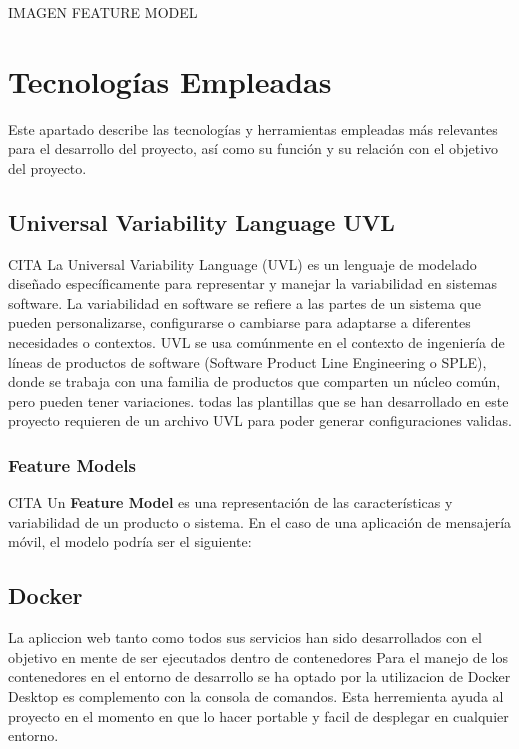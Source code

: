 \documentclass[12pt, a4paper, twoside]{article}
\begin{document}
IMAGEN FEATURE MODEL 












\section{Tecnologías Empleadas}
Este apartado describe las tecnologías y herramientas empleadas más relevantes para el desarrollo del proyecto, así como su función y su relación con el objetivo del proyecto.

\subsection{Universal Variability Language UVL}
CITA 
La Universal Variability Language (UVL) es un lenguaje de modelado diseñado específicamente para representar y manejar la variabilidad en sistemas software. 
La variabilidad en software se refiere a las partes de un sistema que pueden personalizarse, configurarse o cambiarse para adaptarse a diferentes necesidades o contextos. 
UVL se usa comúnmente en el contexto de ingeniería de líneas de productos de software (Software Product Line Engineering o SPLE), donde se trabaja con una familia de productos que comparten un núcleo común, pero pueden tener variaciones.
todas las plantillas que se han desarrollado en este proyecto requieren de un archivo UVL para poder generar configuraciones validas.

\subsubsection{Feature Models}
CITA 
Un \textbf{Feature Model} es una representación de las características y variabilidad de un producto o sistema. En el caso de una aplicación de mensajería móvil, el modelo podría ser el siguiente:

\subsection{Docker}
La apliccion web tanto como todos sus servicios han sido desarrollados con el objetivo en mente de ser ejecutados dentro de contenedores
Para el manejo de los contenedores en el entorno de desarrollo se ha optado por la utilizacion de Docker Desktop es complemento con la consola de comandos.
Esta herremienta ayuda al proyecto en el momento en que lo hacer portable y facil de desplegar en cualquier entorno.
\end{document}
